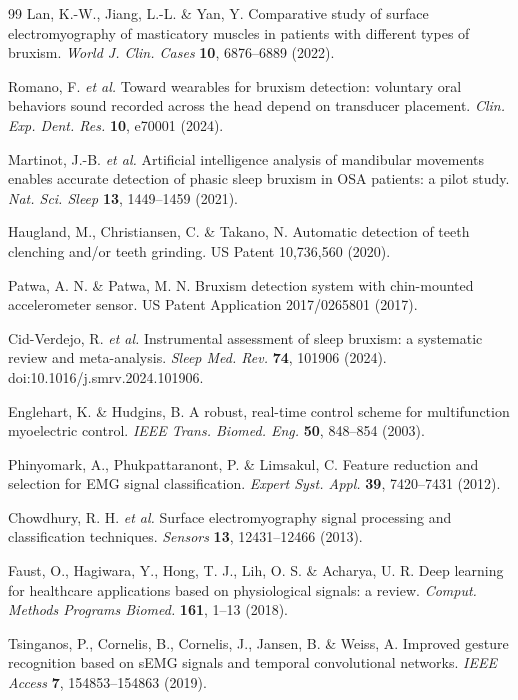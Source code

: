 \documentclass[pdflatex,sn-nature,iicol]{sn-jnl}
\begin{document}
\begin{thebibliography}{99}
Lan, K.-W., Jiang, L.-L. \& Yan, Y. Comparative study of surface electromyography of masticatory muscles in patients with different types of bruxism. \emph{World J. Clin. Cases} \textbf{10}, 6876--6889 (2022).

Romano, F. \emph{et al.} Toward wearables for bruxism detection: voluntary oral behaviors sound recorded across the head depend on transducer placement. \emph{Clin. Exp. Dent. Res.} \textbf{10}, e70001 (2024).

Martinot, J.-B. \emph{et al.} Artificial intelligence analysis of mandibular movements enables accurate detection of phasic sleep bruxism in OSA patients: a pilot study. \emph{Nat. Sci. Sleep} \textbf{13}, 1449--1459 (2021).

Haugland, M., Christiansen, C. \& Takano, N. Automatic detection of teeth clenching and/or teeth grinding. US Patent 10,736,560 (2020).

Patwa, A. N. \& Patwa, M. N. Bruxism detection system with chin-mounted accelerometer sensor. US Patent Application 2017/0265801 (2017).

Cid-Verdejo, R. \emph{et al.} Instrumental assessment of sleep bruxism: a systematic review and meta-analysis. \emph{Sleep Med. Rev.} \textbf{74}, 101906 (2024). doi:10.1016/j.smrv.2024.101906.

Englehart, K. \& Hudgins, B. A robust, real-time control scheme for multifunction myoelectric control. \emph{IEEE Trans. Biomed. Eng.} \textbf{50}, 848--854 (2003).

Phinyomark, A., Phukpattaranont, P. \& Limsakul, C. Feature reduction and selection for EMG signal classification. \emph{Expert Syst. Appl.} \textbf{39}, 7420--7431 (2012).

Chowdhury, R. H. \emph{et al.} Surface electromyography signal processing and classification techniques. \emph{Sensors} \textbf{13}, 12431--12466 (2013).

Faust, O., Hagiwara, Y., Hong, T. J., Lih, O. S. \& Acharya, U. R. Deep learning for healthcare applications based on physiological signals: a review. \emph{Comput. Methods Programs Biomed.} \textbf{161}, 1--13 (2018).

Tsinganos, P., Cornelis, B., Cornelis, J., Jansen, B. \& Weiss, A. Improved gesture recognition based on sEMG signals and temporal convolutional networks. \emph{IEEE Access} \textbf{7}, 154853--154863 (2019).


\end{thebibliography}
\end{document}
